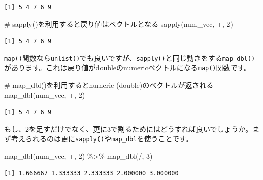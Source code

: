 \documentclass[
  a4paper,
  pandoc,
  ja=standard,
  jafont=haranoaji]{bxjsbook}
\newenvironment{Shaded}{\begin{snugshade}}{\end{snugshade}}
\newcommand{\AttributeTok}[1]{\textcolor[rgb]{0.00,0.48,0.65}{#1}}
\newcommand{\CommentTok}[1]{\textcolor[rgb]{0.37,0.37,0.37}{#1}}
\newcommand{\DecValTok}[1]{\textcolor[rgb]{0.68,0.00,0.00}{#1}}
\newcommand{\FunctionTok}[1]{\textcolor[rgb]{0.28,0.35,0.67}{#1}}
\newcommand{\NormalTok}[1]{\textcolor[rgb]{0.00,0.48,0.65}{#1}}
\newcommand{\SpecialCharTok}[1]{\textcolor[rgb]{0.37,0.37,0.37}{#1}}
\newcommand{\StringTok}[1]{\textcolor[rgb]{0.13,0.47,0.30}{#1}}
\begin{document}
\begin{verbatim}
[1] 5 4 7 6 9
\end{verbatim}

\begin{Shaded}
\begin{Highlighting}[numbers=left,,]
\CommentTok{\# sapply()を利用すると戻り値はベクトルとなる}
\FunctionTok{sapply}\NormalTok{(num\_vec, }\StringTok{\textasciigrave{}}\AttributeTok{+}\StringTok{\textasciigrave{}}\NormalTok{, }\DecValTok{2}\NormalTok{)}
\end{Highlighting}
\end{Shaded}

\begin{verbatim}
[1] 5 4 7 6 9
\end{verbatim}

\texttt{map()}関数なら\texttt{unlist()}でも良いですが、\texttt{sapply()}と同じ動きをする\texttt{map\_dbl()}があります。これは戻り値がdoubleのnumericベクトルになる\texttt{map()}関数です。

\begin{Shaded}
\begin{Highlighting}[numbers=left,,]
\CommentTok{\# map\_dbl()を利用するとnumeric (double)のベクトルが返される}
\FunctionTok{map\_dbl}\NormalTok{(num\_vec, }\StringTok{\textasciigrave{}}\AttributeTok{+}\StringTok{\textasciigrave{}}\NormalTok{, }\DecValTok{2}\NormalTok{)}
\end{Highlighting}
\end{Shaded}

\begin{verbatim}
[1] 5 4 7 6 9
\end{verbatim}

もし、2を足すだけでなく、更に3で割るためにはどうすれば良いでしょうか。まず考えられるのは更に\texttt{sapply()}や\texttt{map\_dbl}を使うことです。

\begin{Shaded}
\begin{Highlighting}[numbers=left,,]
\FunctionTok{map\_dbl}\NormalTok{(num\_vec, }\StringTok{\textasciigrave{}}\AttributeTok{+}\StringTok{\textasciigrave{}}\NormalTok{, }\DecValTok{2}\NormalTok{) }\SpecialCharTok{\%\textgreater{}\%} 
    \FunctionTok{map\_dbl}\NormalTok{(}\StringTok{\textasciigrave{}}\AttributeTok{/}\StringTok{\textasciigrave{}}\NormalTok{, }\DecValTok{3}\NormalTok{)}
\end{Highlighting}
\end{Shaded}

\begin{verbatim}
[1] 1.666667 1.333333 2.333333 2.000000 3.000000
\end{verbatim}
\end{document}
